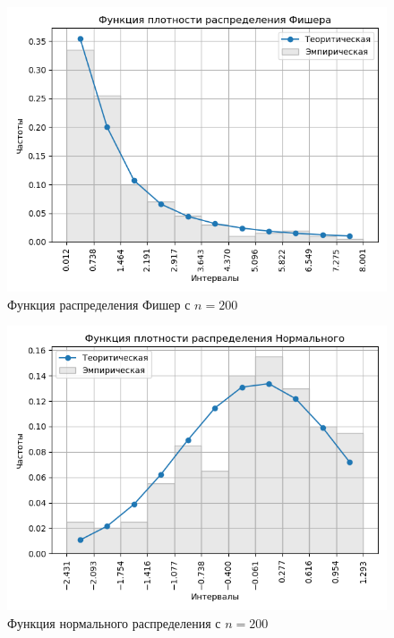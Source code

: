\documentclass[a4]{article}
\begin{document}
\begin{center}
\begin{figure}[H]
\caption{Функция распределения Фишер с $ n = 200$}
\includegraphics[width=\textwidth]{output/task1/fisher_200_histogram.png}
\end{figure}

\begin{figure}[H]
\caption{Функция нормального распределения с $ n = 200$}
\includegraphics[width=\textwidth]{output/task1/norm_200_histogram.png}
\end{figure}


\end{center}
\end{document}
